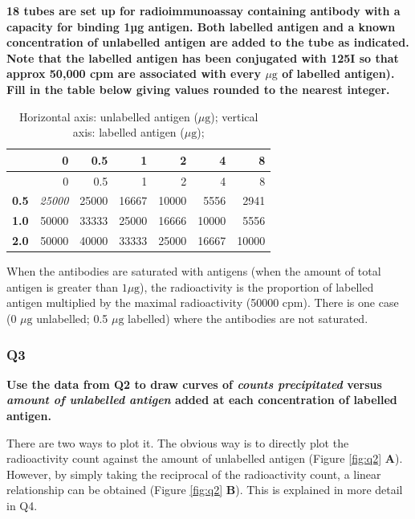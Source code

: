 \documentclass[
]{article}
\begin{document}
\textbf{18 tubes are set up for radioimmunoassay containing antibody with a capacity for binding 1µg antigen. Both labelled antigen and a known concentration of unlabelled antigen are added to the tube as indicated. Note that the labelled antigen has been conjugated with 125I so that approx 50,000 cpm are associated with every \(\mu\text{g}\) of labelled antigen). Fill in the table below giving values rounded to the nearest integer.}

\begin{longtable}[]{@{}rrrrrrr@{}}
\caption{Horizontal axis: unlabelled antigen (\(\mu\text{g}\)); vertical axis: labelled antigen (\(\mu\text{g}\));}\tabularnewline
\toprule
& 0 & 0.5 & 1 & 2 & 4 & 8\tabularnewline
\midrule
\endfirsthead
\toprule
& 0 & 0.5 & 1 & 2 & 4 & 8\tabularnewline
\midrule
\endhead
\textbf{0.5} & \emph{25000} & 25000 & 16667 & 10000 & 5556 & 2941\tabularnewline
\textbf{1.0} & 50000 & 33333 & 25000 & 16666 & 10000 & 5556\tabularnewline
\textbf{2.0} & 50000 & 40000 & 33333 & 25000 & 16667 & 10000\tabularnewline
\bottomrule
\end{longtable}

When the antibodies are saturated with antigens (when the amount of total antigen is greater than \(1 \mu\text{g}\)), the radioactivity is the proportion of labelled antigen multiplied by the maximal radioactivity (50000 cpm). There is one case (0 \(\mu\text{g}\) unlabelled; 0.5 \(\mu\text{g}\) labelled) where the antibodies are not saturated.

\hypertarget{q3}{%
\subsubsection*{Q3}\label{q3}}

\textbf{Use the data from Q2 to draw curves of \emph{counts precipitated} versus \emph{amount of unlabelled antigen} added at each concentration of labelled antigen.}

There are two ways to plot it. The obvious way is to directly plot the radioactivity count against the amount of unlabelled antigen (Figure \ref{fig:q2} \textbf{A}). However, by simply taking the reciprocal of the radioactivity count, a linear relationship can be obtained (Figure \ref{fig:q2} \textbf{B}). This is explained in more detail in Q4.
\end{document}
